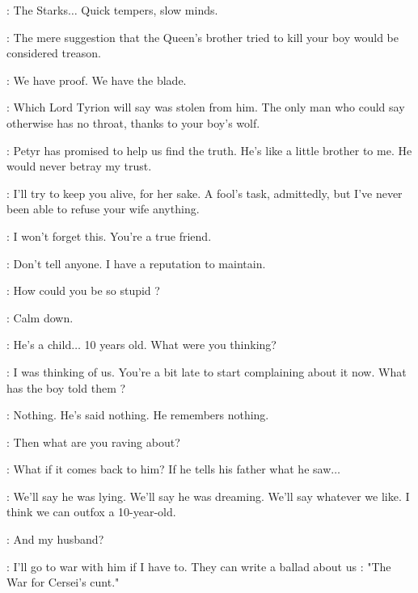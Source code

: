 \LITTLEFINGER:  The Starks$\ldots$ Quick tempers, slow minds. 

\scene


\LITTLEFINGER: The mere suggestion that the Queen's brother tried to kill your boy would be considered treason. 

\CATELYN: We have proof. We have the blade. 

\LITTLEFINGER: Which Lord Tyrion will say was stolen from him. The only man who could say otherwise has no throat, thanks to your boy's wolf. 

\CATELYN: Petyr has promised to help us find the truth. He's like a little brother to me. He would never betray my trust. 

\LITTLEFINGER: I'll try to keep you alive, for her sake. A fool's task, admittedly, but I've never been able to refuse your wife anything. 

\CATELYN: I won't forget this. You're a true friend. 

\LITTLEFINGER: Don't tell anyone. I have a reputation to maintain. 

\scene



\CERSEI: How could you be so stupid ? 

\JAIME: Calm down. 

\CERSEI: He's a child$\ldots$ 10 years old. What were you thinking? 

\JAIME: I was thinking of us. You're a bit late to start complaining about it now. What has the boy told them ? 

\CERSEI: Nothing. He's said nothing. He remembers nothing. 

\JAIME: Then what are you raving about? 

\CERSEI: What if it comes back to him? If he tells his father what he saw$\ldots$ 

\JAIME: We'll say he was lying. We'll say he was dreaming. We'll say whatever we like. I think we can outfox a 10-year-old. 

\CERSEI: And my husband? 

\JAIME: I'll go to war with him if I have to. They can write a ballad about us : "The War for Cersei's cunt." 


